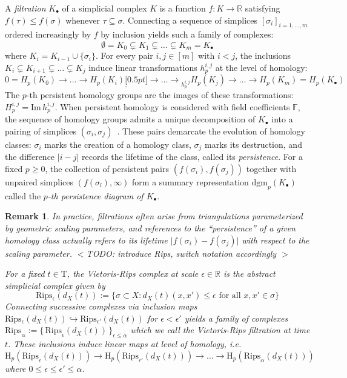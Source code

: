 \documentclass[10pt]{article}
\newtheorem{remark}{Remark}
\begin{document}
A \emph{filtration} $K_\bullet$ of a simplicial complex $K$ is a function $f : K \to \mathbb{R}$ satisfying $f(\tau) \leq f(\sigma)$ whenever $\tau \subseteq \sigma$. Connecting a sequence of simplices $[\sigma_i]_{i=1, \dots, m}$ ordered increasingly by $f$ by inclusion yields such a family of complexes:
\begin{equation}
	\emptyset = K_0 \subsetneq K_1 \subsetneq \dots \subsetneq K_m  = K_\bullet
\end{equation} 
where $K_i  = K_{i-1} \cup \{\sigma_i\}$. For every pair $i,j \in [m]$ with $i < j$, the inclusions $K_i \subsetneq K_{i+1} \subsetneq \dots \subsetneq K_j$ induce linear transformations $h_p^{i,j}$  at the level of homology:
\begin{equation}
	0 = H_p(K_0) \to \dots \to H_p(K_i) \underbracket[0.5pt]{\to \dots \to}_{h_p^{i,j}} H_p(K_j) \to \dots \to H_p(K_m) = H_p(K_\bullet) 
\end{equation}
The $p$-th persistent homology groups are the images of these transformations: $H_{p}^{i,j} = \mathrm{Im}\,h_p^{i,j}$. 
When persistent homology is considered with field coefficients $\mathbb{F}$, the sequence of homology groups admits a unique decomposition of $K_\bullet$ into a pairing of simplices $(\sigma_i, \sigma_j)$~\cite{}. These pairs demarcate the evolution of homology classes: $\sigma_i$ marks the creation of a homology class, $\sigma_j$ marks its destruction, and the difference $\lvert i - j \rvert$ records the lifetime of the class, called its \emph{persistence}. For a fixed $p \geq 0$, the collection of persistent pairs $(f(\sigma_i), f(\sigma_j))$ together with unpaired simplices $(f(\sigma_l), \infty)$ form a summary representation $\mathrm{dgm}_p(K_\bullet)$ called the \emph{$p$-th persistence diagram of $K_\bullet$}.

\begin{remark}
\normalfont In practice, filtrations often arise from triangulations parameterized by geometric scaling parameters, and references to the ``persistence'' of a given homology class actually refers to its lifetime $\lvert f(\sigma_i) - f(\sigma_j) \rvert$ with respect to the scaling parameter.
$<$TODO: introduce Rips, switch notation accordingly $>$

For a fixed $t \in \mathrm{T}$, the \emph{Vietoris-Rips} complex at scale $\epsilon \in \mathbb{R}$ is the abstract simplicial complex given by 
$$\mathrm{Rips_{\epsilon}}(d_X(t)) := \{ \sigma \subset X : d_X(t)(x, x') \leq \epsilon \text{ for all } x, x' \in \sigma \} $$ 
\noindent Connecting successive complexes via inclusion maps $\mathrm{Rips_{\epsilon}}(d_X(t)) \hookrightarrow \mathrm{Rips_{\epsilon'}}(d_X(t))$ for $\epsilon < \epsilon'$ yields a family of complexes $\mathrm{Rips}_{\alpha} := \{ \, \mathrm{Rips}_\epsilon(d_X(t)) \, \}_{\epsilon \leq \alpha}$ which we call the \emph{Vietoris-Rips filtration at time $t$}. 
These inclusions induce linear maps at level of homology, i.e. 
$$ \mathrm{H}_p(\mathrm{Rips}_{\epsilon}(d_X(t))) \to \mathrm{H}_p(\mathrm{Rips}_{\epsilon'}(d_X(t))) \to \dots \to \mathrm{H}_p(\mathrm{Rips}_{\alpha}(d_X(t)))$$ 
where $0 \leq \epsilon \leq \epsilon' \leq \alpha$. 

\end{remark} 
\end{document}
